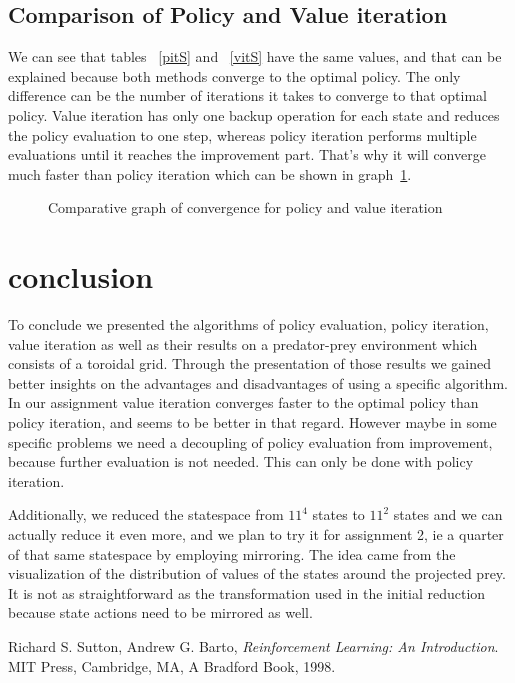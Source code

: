 \documentclass[paper=a4, fontsize=11pt]{scrartcl}
\numberwithin{equation}{section}		%
\numberwithin{figure}{section}			%
\numberwithin{table}{section}				%
\begin{document}
\subsection{Comparison of Policy and Value iteration}
We can see that tables ~\ref{pitS}  and ~\ref{vitS} have the same values, and that can be explained because both methods converge to the optimal policy. The only difference can be the number of iterations it takes to converge to that optimal policy. Value iteration has only one backup operation for each state and reduces the policy evaluation to one step, whereas policy iteration performs multiple evaluations until it reaches the improvement part. That's why it will converge much faster than policy iteration which can be shown in graph~\ref{converge}. 

\begin{figure}[H] \centering
{}
\caption{Comparative graph of convergence for policy and value iteration} \label{converge}
\end{figure}

\section{conclusion}
\label{discussion}
To conclude we presented the algorithms of policy evaluation, policy iteration, value iteration as well as their results on a predator-prey environment which consists of a toroidal grid. Through the presentation of those results we gained better insights on the advantages and disadvantages of using a specific algorithm. In our assignment value iteration converges faster to the optimal policy than policy iteration, and seems to be better in that regard. However maybe in some specific problems we need a decoupling of policy evaluation from improvement, because further evaluation is not needed. This can only be done with policy iteration.

Additionally, we reduced the statespace from $11^4$ states to $11^2$ states and we can actually reduce it even more, and we plan to try it for assignment 2, ie a quarter of that same statespace by employing mirroring. The idea came from the visualization of the distribution of values of the states around the projected prey. It is not as straightforward as the transformation used in the initial reduction because state actions need to be mirrored as well.




\begin{thebibliography}{9}

  Richard S. Sutton, Andrew G. Barto,
  \emph{Reinforcement Learning: An Introduction}.
  MIT Press, Cambridge, MA, 
  A Bradford Book,
  1998.

\end{thebibliography}

\end{document}
